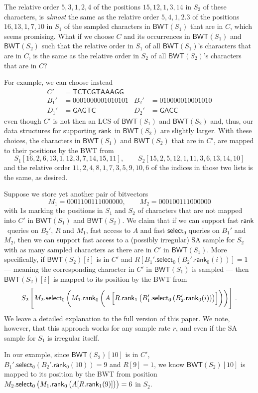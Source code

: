 \documentclass{llncs}
\newcommand{\BWT}
  {\ensuremath{\mathsf{BWT}}}
\newcommand{\rank}
  {\ensuremath{\mathsf{rank}}}
\newcommand{\select}
  {\ensuremath{\mathsf{select}}}
\begin{document}
The relative order \(5, 3, 1, 2, 4\) of the positions \(15, 12, 1, 3, 14\) in
$S_2$ of these characters, is {\em almost} the same as the relative order
\(5, 4, 1, 2. 3\) of the positions \(16, 13, 1, 7, 10\) in $S_1$ of the
sampled characters in \(\BWT (S_1)\) that are in $C$, which seems promising.
What if we choose $C$ and its occurrences in \(\BWT (S_1)\) and \(\BWT
(S_2)\) such that the relative order in $S_1$ of all \(\BWT (S_1)\)'s
characters that are in $C$, is the same as the relative order in $S_2$ of all
\(\BWT (S_2)\)'s characters that are in $C$?

For example, we can choose instead
\begin{align*}
C' & = \mathsf{TCTCGTAAAGG}\\
B_1' & = 0001000001010101 & B_2' & = 010000010001010\\
D_1' & = \mathsf{GAGTC} & D_2' & = \mathsf{GACC}
\end{align*}
even though $C'$ is not then an LCS of \(\BWT (S_1)\) and \(\BWT (S_2)\) and,
thus, our data structures for supporting \rank\ in \(\BWT (S_2)\) are
slightly larger.  With these choices, the characters in \(\BWT (S_1)\) and
\(\BWT (S_2)\) that are in $C'$, are mapped to their positions by the BWT
from
$$
S_1 [16, 2, 6, 13, 1, 12, 3, 7, 14, 15, 11],\qquad
S_2 [15, 2, 5, 12, 1, 11, 3, 6, 13, 14, 10]
$$
and the relative order \(11, 2, 4, 8, 1, 7, 3, 5, 9, 10, 6\) of the indices
in those two lists is the same, as desired.

Suppose we store yet another pair of bitvectors
$$
M_1 = 0001100111000000,\qquad
M_2 = 000100111000000
$$
with 1s marking the positions in $S_1$ and $S_2$ of characters that are not
mapped into $C'$ in \(\BWT (S_1)\) and \(\BWT (S_2)\).  We claim that if we
can support fast \rank\ queries on $B_2'$, $R$ and $M_1$, fast access to $A$
and fast $\select_0$ queries on $B_1'$ and $M_2$, then we can support fast
access to a (possibly irregular) SA sample for $S_2$ with as many
sampled characters as there are in $C'$ in \(\BWT (S_1)\).  More
specifically, if \(\BWT (S_2) [i]\) is in $C'$ and
\(R [B_1'.\select_0 (B_2'.\rank_0 (i))] = 1\)
--- meaning the corresponding character in $C'$ in \(\BWT (S_1)\) is sampled --- then \(\BWT (S_2) [i]\) is mapped to its position by the BWT from
\[S_2 \left[ \rule{0ex}{4ex}
    M_2.\select_0 \left( \rule{0ex}{3.5ex}
      M_1.\rank_0 \left( \rule{0ex}{3ex}
        A \left[ \rule{0ex}{2.5ex}
          R.\rank_1 \left( \rule{0ex}{2ex}
            B_1'.\select_0 \left(
              B_2'.\rank_0 (i)
            \right)
          \right)
        \right]
      \right)
    \right)
  \right]\,.\]
We leave a detailed explanation to the full version of this paper.  We note,
however, that this approach works for any sample rate $r$, and even if the SA
sample for $S_1$ is irregular itself.

In our example, since \(\BWT (S_2) [10]\) is in $C'$, \(B_1'.\select_0
(B_2'.\rank_0 (10)) = 9\) and \(R [9] = 1\), we know \(\BWT (S_2) [10]\) is
mapped to its position by the BWT from position
\(M_2.\select_0 \left(
    M_1.\rank_0 \left( \rule{0ex}{2ex}
      A [R.\rank_1 (9)]
    \right)
  \right)
= 6\)
in \(S_2\).
\end{document}
